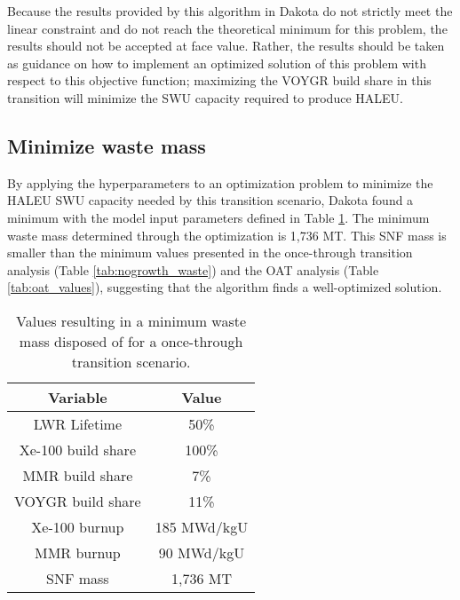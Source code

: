 Because the results provided by this algorithm in Dakota do not strictly 
meet the linear constraint and do not reach the theoretical minimum for 
this problem, the results should not be accepted at face value. 
Rather, the results should be taken as guidance on how to implement an 
optimized solution of this problem 
with respect to this objective function; maximizing the VOYGR build share in 
this transition will minimize the \gls{SWU} capacity required to produce 
\gls{HALEU}.  

\subsection{Minimize waste mass}
By applying the hyperparameters to an optimization problem to minimize the 
\gls{HALEU} \gls{SWU} capacity needed by this transition scenario, Dakota
found a minimum with the model input parameters defined in Table 
\ref{tab:soga_ot_waste}. The minimum waste mass determined through the 
optimization is 1,736 MT. This \gls{SNF} mass is smaller than the minimum 
values presented in the once-through transition 
analysis (Table \ref{tab:nogrowth_waste}) and the \gls{OAT} analysis 
(Table \ref{tab:oat_values}), suggesting that the algorithm finds 
a well-optimized solution. 

\begin{table}[h!]
    \centering 
    \caption{Values resulting in a minimum waste mass disposed of for 
              a once-through transition scenario.}
    \label{tab:soga_ot_waste}
    \begin{tabular}{c c}
        \hline
        Variable & Value \\
        \hline
        LWR Lifetime & 50\%\\
        Xe-100 build share & 100\%\\
        MMR build share & 7\%\\
        VOYGR build share & 11\%\\
        Xe-100 burnup & 185 MWd/kgU\\
        MMR burnup & 90 MWd/kgU\\
        \hline
        SNF mass & 1,736 MT \\
        \hline
    \end{tabular}
\end{table}

